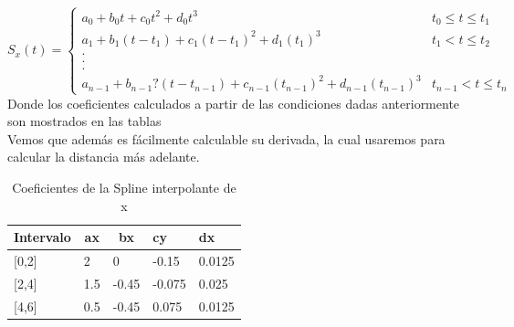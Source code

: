 \documentclass{article}
\begin{document}
    \begin{equation*}
        S_x(t)=
        \begin{cases}
            a_0 + b_0t + c_0t^2 + d_0t^3 & t_0 \leq t \leq t_1 \\
            a_1 + b_1(t-t_1) + c_1(t-t_1)^2 + d_1(t_1)^3 & t_1 < t \leq t_2 \\
            .\\
            .\\
            .\\
            a_{n-1} + b_{n-1}?(t-t_{n-1}) + c_{n-1}(t_{n-1})^2 + d_{n-1}(t_{n-1})^3 & t_{n-1} < t \leq t_n
        \end{cases}
    \end{equation*}
    \indent Donde los coeficientes calculados a partir de las condiciones dadas anteriormente son mostrados en las tablas\\
    \indent Vemos que además es fácilmente calculable su derivada, la cual usaremos para calcular la distancia más adelante.
    \begin{table}[h]
        \centering
        \begin{tabular}{|l|l|l|l|l|}
            \hline
            \multicolumn{1}{|c|}{\textbf{Intervalo}} & \multicolumn{1}{c|}{\textbf{ax}} & \multicolumn{1}{c|}{\textbf{bx}} & \textbf{cy} & \textbf{dx} \\ \hline
            {[}0,2{]}                                & 2                                  & 0                                  & -0.15         & 0.0125        \\ \hline
            {[}2,4{]}                                & 1.5                                & -0.45                              & -0.075        & 0.025         \\ \hline
            {[}4,6{]}                                & 0.5                                & -0.45                              & 0.075         & 0.0125        \\ \hline
        \end{tabular}
        \caption{Coeficientes de la Spline interpolante de x}
        \label{Tabla}
    \end{table}
\end{document}
